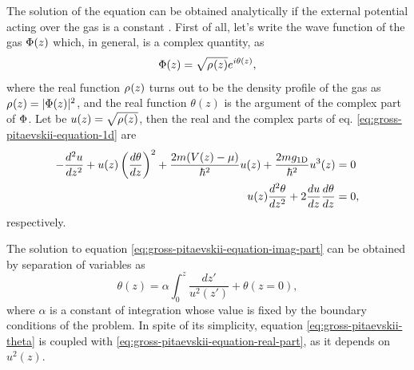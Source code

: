 The solution of the {\GP} equation can be obtained analytically if the external
potential acting over the gas is a constant
\cite{bib:zakharov-sov-phys-jetp.34.1972, bib:smerzi-phys-rev-E.70.016605.2004,
  bib:seaman-phys-rev-A.71.033622.2005}. First of all, let's write the wave
function of the gas ${\Phi}(z)$ which, in general, is a complex quantity,
as
%
\begin{equation}
  \label{eq:gross-pitaevskii-wave-function}
  {\Phi}(z) = \sqrt{{\rho_{}}(z)} e^{i \theta(z)},
\end{equation}
%
where the real function ${\rho_{}}(z)$ turns out to be the density profile of the
gas as ${\rho_{}}(z) = |{\Phi}(z)|^2$, and the real function $\theta(z)$ is
the argument of the complex part of ${\Phi}$. Let be $u(z) =
  \sqrt{{\rho_{}}(z)}$, then the real and the complex parts of eq.
\eqref{eq:gross-pitaevskii-equation-1d} are
%
\begin{align}
  \label{eq:gross-pitaevskii-equation-real-part} -\frac{d^2 u}{dz^2} + u(z) \left(\frac{d\theta}{dz}\right)^2 + \frac{2m (V(z) - \mu)}{\hbar^2} u(z) + \frac{2 m g_{ \mathrm{1D} }}{\hbar^2} u^3(z) & = 0  \\
  \label{eq:gross-pitaevskii-equation-imag-part} u(z) \frac{d^2 \theta}{dz^2}  + 2\frac{du}{dz} \frac{d \theta}{dz}                                                                        & = 0,
\end{align}
%
respectively.

The solution to equation \eqref{eq:gross-pitaevskii-equation-imag-part} can be
obtained by separation of variables as
%
\begin{equation}
  \label{eq:gross-pitaevskii-theta}
  \theta(z) = \alpha \int_{0}^{z} \frac{dz'}{u^2(z')} + \theta(z=0),
\end{equation}
%
where $\alpha$ is a constant of integration whose value is fixed by the boundary
conditions of the problem. In spite of its simplicity, equation
\eqref{eq:gross-pitaevskii-theta} is coupled with
\eqref{eq:gross-pitaevskii-equation-real-part}, as it depends on $u^2(z)$.

